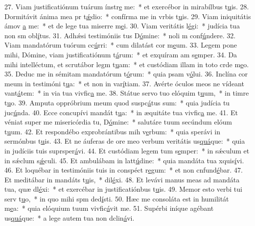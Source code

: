 27. Viam justificatiónum tuárum ínstr\uline{e} me:~* et exercébor in mirabílbus t\uline{u}is.
28. Dormitávit ánima mea pr t\uline{ǽ}dio:~* confírma me in vrbis t\uline{u}is.
29. Viam iniquitátis ámov \uline{a} me:~* et de lege tua miserre m\uline{e}i.
30. Viam veritátis l\uline{é}gi:~* judícia tua non sm obl\uline{í}tus.
31. Adhǽsi testimóniis tus D\uline{ó}mine:~* noli m conf\uline{ú}ndere.
32. Viam mandatórum tuórum cc\uline{ú}rri:~* cum dilatást cor m\uline{e}um.
33. Legem pone mihi, Dómine, viam justificatiónum t\uline{á}rum:~* et exquíram am s\uline{e}mper.
34. Da mihi intelléctum, et scrutábor legm t\uline{u}am:~* et custódiam illam in toto crde m\uline{e}o.
35. Deduc me in sémitam mandatórum t\uline{ó}rum:~* quia psam v\uline{ó}lui.
36. Inclína cor meum in testimóni t\uline{u}a:~* et non in var\uline{í}tiam.
37. Avérte óculos meos ne vídeant vant\uline{á}tem:~* in via tua vivfic\uline{a} me.
38. Státue servo tuo elóquim t\uline{u}um,~* in timre t\uline{u}o.
39. Amputa oppróbrium meum quod suspc\uline{á}tus sum:~* quia judícia tu juc\uline{ú}nda.
40. Ecce concupívi mandát t\uline{u}a:~* in æquitáte tua vivfic\uline{a} me.
41. Et véniat super me misericórdia tu, D\uline{ó}mine:~* salutáre tuum secúndum elóum t\uline{u}um.
42. Et respondébo exprobrántibus mih v\uline{e}rbum:~* quia sperávi in sermónbus t\uline{u}is.
43. Et ne áuferas de ore meo verbum veritátis us\uline{quá}que:~* quia in judíciis tuis suprsper\uline{á}vi.
44. Et custódiam legem tum s\uline{e}mper:~* in sǽculum et in sǽclum s\uline{ǽ}culi.
45. Et ambulábam in latt\uline{ú}dine:~* quia mandáta tua xquis\uline{í}vi.
46. Et loquébar in testimóniis tuis in conspéct r\uline{e}gum:~* et non cnfund\uline{é}bar.
47. Et meditábar in mandáts t\uline{u}is,~*  dil\uline{é}xi.
48. Et levávi manus meas ad mandáta tua, quæ dl\uline{é}xi:~* et exercébar in justificatiónbus t\uline{u}is.
49. Memor esto verbi tui serv t\uline{u}o,~* in quo mihi spm ded\uline{í}sti.
50. Hæc me consoláta est in humilitát m\uline{e}a:~* quia elóquium tuum vivfic\uline{á}vit me.
51. Supérbi iníque agébant us\uline{quá}que:~* a lege autem tua non dclin\uline{á}vi.
